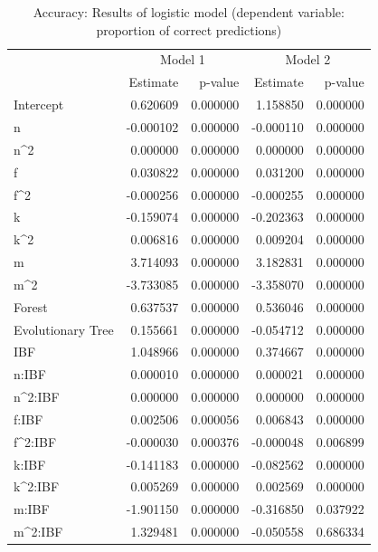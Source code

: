 \documentclass[]{elsarticle} %
\begin{document}
\begin{table}

\caption{\label{tab:model-accuracy-results}\label{tab:model-accuracy-results}Accuracy: Results of logistic model (dependent variable: proportion of correct predictions)}
\centering
\begin{tabular}[t]{lrrrr}
\toprule
\multicolumn{1}{c}{ } & \multicolumn{2}{c}{Model 1} & \multicolumn{2}{c}{Model 2} \\
\cmidrule(l{2pt}r{2pt}){2-3} \cmidrule(l{2pt}r{2pt}){4-5}
  & Estimate & p-value & Estimate & p-value\\
\midrule
Intercept & 0.620609 & 0.000000 & 1.158850 & 0.000000\\
n & -0.000102 & 0.000000 & -0.000110 & 0.000000\\
n\textasciicircum{}2 & 0.000000 & 0.000000 & 0.000000 & 0.000000\\
f & 0.030822 & 0.000000 & 0.031200 & 0.000000\\
f\textasciicircum{}2 & -0.000256 & 0.000000 & -0.000255 & 0.000000\\
\addlinespace
k & -0.159074 & 0.000000 & -0.202363 & 0.000000\\
k\textasciicircum{}2 & 0.006816 & 0.000000 & 0.009204 & 0.000000\\
m & 3.714093 & 0.000000 & 3.182831 & 0.000000\\
m\textasciicircum{}2 & -3.733085 & 0.000000 & -3.358070 & 0.000000\\
Forest & 0.637537 & 0.000000 & 0.536046 & 0.000000\\
\addlinespace
Evolutionary Tree & 0.155661 & 0.000000 & -0.054712 & 0.000000\\
\hline
IBF & 1.048966 & 0.000000 & 0.374667 & 0.000000\\
n:IBF & 0.000010 & 0.000000 & 0.000021 & 0.000000\\
n\textasciicircum{}2:IBF & 0.000000 & 0.000000 & 0.000000 & 0.000000\\
f:IBF & 0.002506 & 0.000056 & 0.006843 & 0.000000\\
\addlinespace
f\textasciicircum{}2:IBF & -0.000030 & 0.000376 & -0.000048 & 0.006899\\
k:IBF & -0.141183 & 0.000000 & -0.082562 & 0.000000\\
k\textasciicircum{}2:IBF & 0.005269 & 0.000000 & 0.002569 & 0.000000\\
m:IBF & -1.901150 & 0.000000 & -0.316850 & 0.037922\\
m\textasciicircum{}2:IBF & 1.329481 & 0.000000 & -0.050558 & 0.686334\\

\end{tabular}
\end{table}
\end{document}
